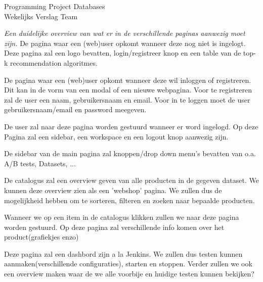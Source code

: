 \documentclass[a4paper]{article}
\newcounter{team}
\begin{document}
	
	\begin{Minutes}{Programming Project Databases \\ Wekelijks Verslag Team }
		\missingNoExcuse{}
		
		\maketitle
		
			\emph{Een duidelijke overview van wat er in de verschillende paginas aanwezig moet zijn.}
			De pagina waar een (web)user opkomt wanneer deze nog niet is ingelogt. Deze pagina zal een logo bevatten, login/registreer knop en een table van de top-k recommendation algoritmes.
			
			De pagina waar een (web)user opkomt wanneer deze wil inloggen of registreren. Dit kan in de vorm van een modal of een nieuwe webpagina. Voor te registreren zal de user een naam, gebruikersnaam en email. Voor in te loggen moet de user gebruikersnaam/email en password meegeven.
			
			De user zal naar deze pagina worden gestuurd wanneer er word ingelogd. Op deze Pagina zal een sidebar, een workspace en een logout knop aanwezig zijn. 
			
			De sidebar van de main pagina zal knoppen/drop down menu's bevatten van o.a. A/B tests, Datasets, ...
			
			De catalogus zal een overview geven van alle producten in de gegeven dataset. We kunnen deze overview zien als een 'webshop' pagina. We zullen dus de mogelijkheid hebben om te sorteren, filteren en zoeken naar bepaalde producten.
			
			Wanneer we op een item in de catalogus klikken zullen we naar deze pagina worden gestuurd. Op deze pagina zal verschillende info komen over het product(grafiekjes enzo)
			
			Deze pagina zal een dashbord zijn a la Jenkins. We zullen dus testen kunnen aanmaken(verschillende configuraties), starten en stoppen. Verder zullen we ook een overview maken waar de we alle voorbije en huidige testen kunnen bekijken?
		

\end{Minutes}
\end{document}
